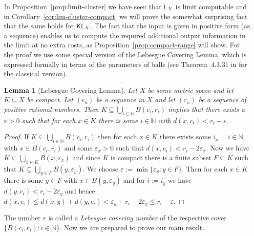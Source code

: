 \documentclass[a4paper]{amsart}
\def\IN{{\mathbb{N}}}
\def\In{\subseteq}
\def\L{\text{\rm\sffamily L}}
\def\KL{\text{\rm\sffamily KL}}
\newtheorem{lemma}[theorem]{Lemma}
\theoremstyle{definition}
\begin{document}
In Proposition~\ref{prop:limit-cluster} we have seen that $\L_X$ is limit computable and
in Corollary~\ref{cor:lim-cluster-compact} we will prove the somewhat surprising fact that the same holds for $\KL_X$.
The fact that the input is given in positive form (as a sequence)
enables us to compute the required additional output information in the limit at no extra costs,
as Proposition~\ref{prop:compact-range} will show.
For the proof we use some special version of the Lebesgue Covering Lemma, which is expressed formally
in terms of the parameters of balls
(see Theorem~4.3.31 in \cite{Eng89} for the classical version).

\begin{lemma}[Lebesgue Covering Lemma]
\label{lem:lebesgue}
Let $X$ be some metric space and let $K\In X$ be compact.
Let $(c_n)$ be a sequence in $X$ and let $(r_n)$ be a sequence
of positive rational numbers. Then $K\In\bigcup_{i\in\IN}B(c_i,r_i)$
implies that there exists a $\varepsilon>0$ such that 
for each $x\in K$ there is some $i\in\IN$ with $d(x,c_i)<r_i-\varepsilon$.
\end{lemma}
\begin{proof}
If $K\In\bigcup_{i\in\IN}B(c_i,r_i)$ then for each $x\in K$ there exists some $i_x=i\in\IN$
with $x\in B(c_i,r_i)$ and some $\varepsilon_x>0$ such that $d(x,c_i)<r_i-2\varepsilon_x$. 
Now we have $K\In\bigcup_{x\in K}B(x,\varepsilon_x)$ and since $K$ is compact
there is a finite subset $F\In K$ such that $K\In\bigcup_{y\in F}B(y,\varepsilon_y)$.
We choose $\varepsilon:=\min\{\varepsilon_y:y\in F\}$. Then for each $x\in K$
there is some $y\in F$ with $x\in B(y,\varepsilon_y)$ and for $i:=i_y$ we have $d(y,c_i)<r_i-2\varepsilon_y$
and hence $d(x,c_i)\leq d(x,y)+d(y,c_i)<\varepsilon_y+r_i-2\varepsilon_y\leq r_i-\varepsilon$. 
\end{proof}

The number $\varepsilon$ is called a {\em Lebesgue covering number} of the 
respective cover $\{B(c_i,r_i):i\in\IN\}$.
Now we are prepared to prove our main result.
\end{document}
